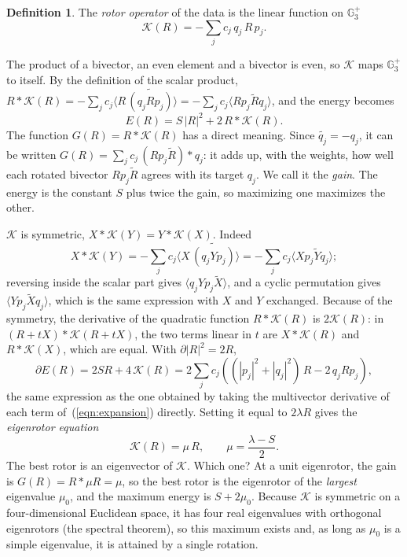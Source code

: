 \documentclass{birkjour}
\theoremstyle{definition}
\newtheorem{defn}[thm]{Definition}
\theoremstyle{remark}
\numberwithin{equation}{section}
\newcommand{\rev}[1]{\widetilde{#1}}
\newcommand{\scal}[1]{\langle #1 \rangle}
\newcommand{\K}{\mathcal{K}}
\newcommand{\Ge}{\mathbb{G}}
\begin{document}
\begin{defn}
The \emph{rotor operator} of the data is the linear function on $\Ge_3^+$
\begin{equation}
\label{eqn:operator}
\K(R) = -\sum_j c_j\, q_j\, R\, p_j.
\end{equation}
\end{defn}
The product of a bivector, an even element and a bivector is even, so $\K$ maps $\Ge_3^+$ to itself. By the definition of the scalar product, $R * \K(R) = -\sum_j c_j \scal{R\, \rev{(q_j R p_j)}} = -\sum_j c_j \scal{R p_j \rev{R} q_j}$, and the energy becomes
\begin{equation}
\label{eqn:energy_K}
E(R) = S\, |R|^2 + 2\, R * \K(R).
\end{equation}
The function $G(R) = R * \K(R)$ has a direct meaning. Since $\rev{q_j} = -q_j$, it can be written $G(R) = \sum_j c_j\, (R p_j \rev{R}) * q_j$: it adds up, with the weights, how well each rotated bivector $R p_j \rev{R}$ agrees with its target $q_j$. We call it the \emph{gain}. The energy is the constant $S$ plus twice the gain, so maximizing one maximizes the other.

$\K$ is symmetric, $X * \K(Y) = Y * \K(X)$. Indeed
\begin{equation*}
X * \K(Y) = -\sum_j c_j \scal{X\, \rev{(q_j Y p_j)}} = -\sum_j c_j \scal{X p_j \rev{Y} q_j};
\end{equation*}
reversing inside the scalar part gives $\scal{q_j Y p_j \rev{X}}$, and a cyclic permutation gives $\scal{Y p_j \rev{X} q_j}$, which is the same expression with $X$ and $Y$ exchanged. Because of the symmetry, the derivative of the quadratic function $R * \K(R)$ is $2 \K(R)$: in $(R + tX) * \K(R + tX)$, the two terms linear in $t$ are $X * \K(R)$ and $R * \K(X)$, which are equal. With $\partial |R|^2 = 2R$,
\begin{equation}
\label{eqn:derivative_energy}
\partial E(R) = 2 S R + 4\, \K(R) = 2 \sum_j c_j \left( (|p_j|^2 + |q_j|^2)\, R - 2\, q_j R p_j \right),
\end{equation}
the same expression as the one obtained by taking the multivector derivative of each term of~(\ref{eqn:expansion}) directly. Setting it equal to $2 \lambda R$ gives the \emph{eigenrotor equation}
\begin{equation}
\label{eqn:eigenrotor}
\K(R) = \mu\, R, \qquad \mu = \frac{\lambda - S}{2}.
\end{equation}
The best rotor is an eigenvector of $\K$. Which one? At a unit eigenrotor, the gain is $G(R) = R * \mu R = \mu$, so the best rotor is the eigenrotor of the \emph{largest} eigenvalue $\mu_0$, and the maximum energy is $S + 2 \mu_0$. Because $\K$ is symmetric on a four-dimensional Euclidean space, it has four real eigenvalues with orthogonal eigenrotors (the spectral theorem), so this maximum exists and, as long as $\mu_0$ is a simple eigenvalue, it is attained by a single rotation.
\end{document}
